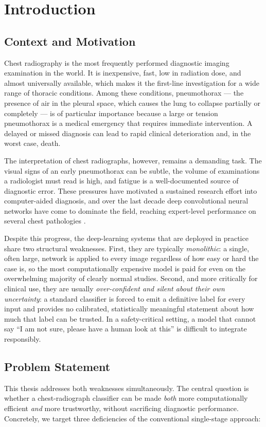 \chapter{Introduction}
\label{ch:introduction}

\section{Context and Motivation}
Chest radiography is the most frequently performed diagnostic imaging examination in the world. It is inexpensive, fast, low in radiation dose, and almost universally available, which makes it the first-line investigation for a wide range of thoracic conditions. Among these conditions, pneumothorax --- the presence of air in the pleural space, which causes the lung to collapse partially or completely --- is of particular importance because a large or tension pneumothorax is a medical emergency that requires immediate intervention. A delayed or missed diagnosis can lead to rapid clinical deterioration and, in the worst case, death.

The interpretation of chest radiographs, however, remains a demanding task. The visual signs of an early pneumothorax can be subtle, the volume of examinations a radiologist must read is high, and fatigue is a well-documented source of diagnostic error. These pressures have motivated a sustained research effort into computer-aided diagnosis, and over the last decade deep convolutional neural networks have come to dominate the field, reaching expert-level performance on several chest pathologies \cite{rajpurkar2017chexnet, irvin2019chexpert}.

Despite this progress, the deep-learning systems that are deployed in practice share two structural weaknesses. First, they are typically \emph{monolithic}: a single, often large, network is applied to every image regardless of how easy or hard the case is, so the most computationally expensive model is paid for even on the overwhelming majority of clearly normal studies. Second, and more critically for clinical use, they are usually \emph{over-confident and silent about their own uncertainty}: a standard classifier is forced to emit a definitive label for every input and provides no calibrated, statistically meaningful statement about how much that label can be trusted. In a safety-critical setting, a model that cannot say ``I am not sure, please have a human look at this'' is difficult to integrate responsibly.

\section{Problem Statement}
This thesis addresses both weaknesses simultaneously. The central question is whether a chest-radiograph classifier can be made \emph{both} more computationally efficient \emph{and} more trustworthy, without sacrificing diagnostic performance. Concretely, we target three deficiencies of the conventional single-stage approach:

